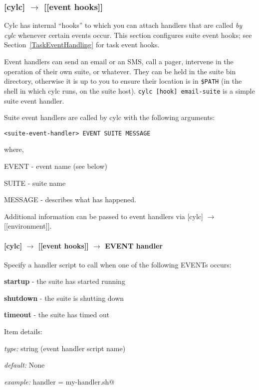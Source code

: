 \subsubsection[{[[}event hooks{]]}]{[cylc] $\rightarrow$ [[event hooks]]}
\label{SuiteEventHandling}

Cylc has internal ``hooks'' to which you can attach handlers that are 
called {\em by cylc} whenever certain events occur. This section
configures suite event hooks; see Section~\ref{TaskEventHandling} for
task event hooks.

Event handlers can send an email or an SMS, call a pager, intervene in
the operation of their own suite, or whatever.
They can be held in the suite bin directory, otherwise it is up to you
to ensure their location is in \lstinline=$PATH= (in the shell in which
cylc runs, on the suite host).
\lstinline=cylc [hook] email-suite= is a simple suite event handler.

Suite event handlers are called by cylc with the following arguments:
\begin{lstlisting}
<suite-event-handler> EVENT SUITE MESSAGE
\end{lstlisting}
where,
\begin{myitemize}
    \item EVENT - event name (see below)
    \item SUITE - suite name
    \item MESSAGE - describes what has happened.
\end{myitemize}

Additional information can be passed to event handlers via 
[cylc] $\rightarrow$ [[environment]].

\paragraph[EVENT handler]{[cylc] $\rightarrow$ [[event hooks]] $\rightarrow$ EVENT handler}

Specify a handler script to call when one of the following EVENTs occurs:
\begin{myitemize}
    \item {\bf startup}  - the suite has started running 
    \item {\bf shutdown} - the suite is shutting down
    \item {\bf timeout}  - the suite has timed out
\end{myitemize}

Item details:
\begin{myitemize}
    \item {\em type:} string (event handler script name)
    \item {\em default:} None
    \item {\em example:} \lstinline@startup handler = my-handler.sh@
\end{myitemize}

